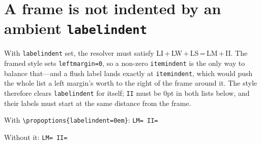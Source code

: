 \documentclass{article}
\begin{document}
\section{A frame is not indented by an ambient \texttt{labelindent}}

With \texttt{labelindent} set, the resolver must satisfy
LI\,+\,LW\,+\,LS\,=\,LM\,+\,II\@.  The framed style sets \texttt{leftmargin=0},
so a non-zero \texttt{itemindent} is the only way to balance that---and a
flush label lands exactly at \texttt{itemindent}, which would push the whole
list a left margin's worth to the right of the frame around it.  The style
therefore clears \texttt{labelindent} for itself; \texttt{II} must be 0pt in
both lists below, and their labels must start at the same distance from the
frame.

\begingroup
{}
\begin{prop}[style=framed]
  \item[name=Note] With \verb|\propoptions{labelindent=0em}|:
    \texttt{LM=\the\leftmargin\ II=\the\itemindent}
\end{prop}
\endgroup

\begin{prop}[style=framed]
  \item[name=Note] Without it:
    \texttt{LM=\the\leftmargin\ II=\the\itemindent}
\end{prop}
\end{document}
